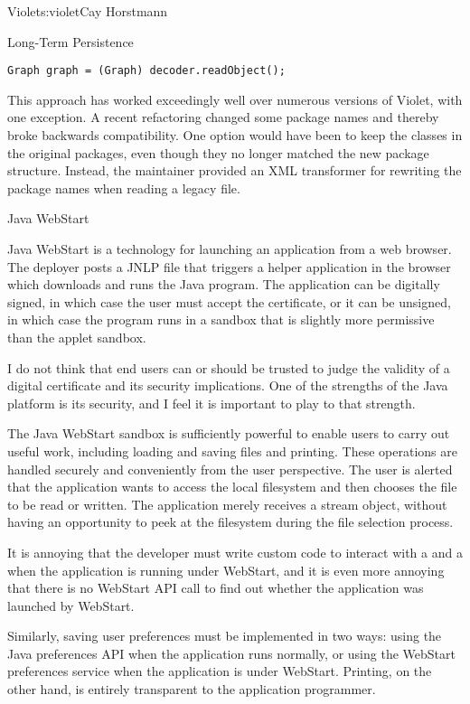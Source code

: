 \begin{aosachapter}{Violet}{s:violet}{Cay Horstmann}
\begin{aosasect1}{Long-Term Persistence}
\begin{verbatim}
Graph graph = (Graph) decoder.readObject();
\end{verbatim}

This approach has worked exceedingly well over numerous versions of
Violet, with one exception. A recent refactoring changed
some package names and thereby broke backwards compatibility.
One option would have been to keep the classes in the original packages,
even though they no longer matched the new package structure.
Instead, the maintainer provided an XML
transformer for rewriting the package names when reading a legacy
file.

\end{aosasect1}

\begin{aosasect1}{Java WebStart}

Java WebStart is a technology for launching an application from a web
browser. The deployer posts a JNLP file that triggers a helper
application in the browser which downloads and runs the Java
program. The application can be digitally signed, in which case the
user must accept the certificate, or it can be unsigned, in which case
the program runs in a sandbox that is slightly more permissive than
the applet sandbox.

I do not think that end users can or should be trusted to judge the
validity of a digital certificate and its security implications. One
of the strengths of the Java platform is its security, and I feel it
is important to play to that strength.

The Java WebStart sandbox is sufficiently powerful to enable users to
carry out useful work, including loading and saving files and
printing.  These operations are handled securely and conveniently from
the user perspective. The user is alerted that the application wants
to access the local filesystem and then chooses the file to be read
or written. The application merely receives a stream object, without
having an opportunity to peek at the filesystem during the file
selection process.

It is annoying that the developer must write
custom code to interact with a  and a
 when the application is running under WebStart,
and it is even more annoying that there is no WebStart API call to
find out whether the application was launched by WebStart.

Similarly, saving user preferences must be implemented in two ways:
using the Java preferences API when the application runs normally, or
using the WebStart preferences service when the application is under
WebStart. Printing, on the other hand, is entirely transparent to the
application programmer.


\end{aosasect1}
\end{aosachapter}
